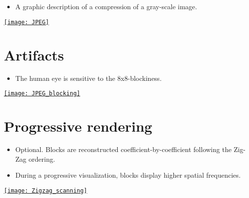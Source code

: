 \section*{}
\begin{itemize}
\item A graphic description of a compression of a gray-scale image.
\end{itemize}
\vspace{-2ex}
\begin{center}
  \href{https://link.springer.com/article/10.1007/s40799-019-00358-4}{\texttt{[image: JPEG]}}
\end{center}

\section{Artifacts}
\begin{itemize}
\item The human eye is sensitive to the 8x8-blockiness.
\end{itemize}
\vspace{-2ex}
\begin{center}
  \href{https://thesai.org/Publications/ViewPaper?Volume=6&Issue=4&Code=ijacsa&SerialNo=16}{\texttt{[image: JPEG\_blocking]}}
\end{center}

\section{Progressive rendering}
\begin{itemize}
\item Optional. Blocks are reconstructed coefficient-by-coefficient following the Zig-Zag ordering.
\item During a progressive visualization, blocks display higher
  spatial frequencies.
\end{itemize}
\begin{center}
  \href{https://es.m.wikipedia.org/wiki/Archivo:Zigzag_scanning.jpg}{\texttt{[image: Zigzag\_scanning]}}
\end{center}

